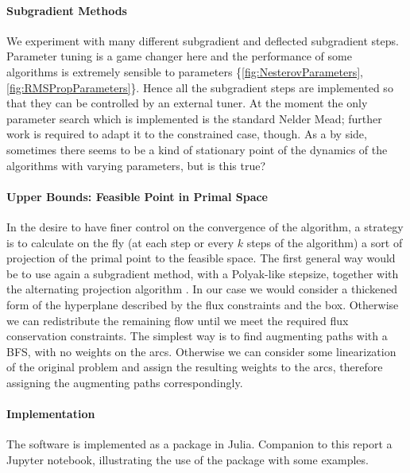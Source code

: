 \documentclass[10pt,twoside,book,a5paper]{ncc}
\begin{document}
\paragraph{Subgradient Methods} We experiment with many different subgradient and deflected subgradient steps. Parameter tuning is a game changer here and the performance of some algorithms is extremely sensible to parameters \{\ref{fig:NesterovParameters}, \ref{fig:RMSPropParameters}\}. 
Hence all the subgradient steps are implemented so that they can be controlled by an external tuner. At the moment the only parameter search which is implemented is the standard Nelder Mead; further work is required to adapt it to the constrained case, though. As a by side, sometimes there seems to be a kind of stationary point of the dynamics of the algorithms with varying parameters, but is this true?
\paragraph{Upper Bounds: Feasible Point in Primal Space} In the desire to have finer control on the convergence of the algorithm, a strategy is to calculate on the fly (at each step or every $k$ steps of the algorithm) a sort of projection of the primal point to the feasible space. The first general way would be to use again a subgradient method, with a Polyak-like stepsize, together with the alternating projection algorithm \cite{NotesBoyd}. In our case we would consider a thickened form of the hyperplane described by the flux constraints and the box.
Otherwise we can redistribute the remaining flow until we meet the required flux conservation constraints. The simplest way is to find augmenting paths with a BFS, with no weights on the arcs. Otherwise we can consider some linearization of the original problem and assign the resulting weights to the arcs, therefore assigning the augmenting paths correspondingly.

\paragraph{Implementation}
The software is implemented as a package in Julia. Companion to this report a Jupyter notebook, illustrating the use of the package with some examples.
\end{document}
